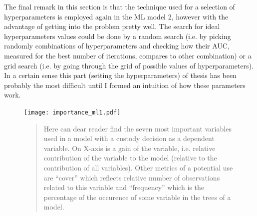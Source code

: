 \documentclass[12pt, twoside,openany]{book} %
\begin{document}
The final remark in this section is that the technique used for a selection of hyperparameters is employed again in the ML model 2, however with the advantage of getting into the problem pretty well. The search for ideal hyperparameters values could be done by a random search (i.e. by picking randomly combinations of hyperparameters and checking how their AUC, measured for the best number of iterations, compares to other combination) or a grid search (i.e. by going through the grid of possible values of hyperparameters). In a certain sense this part (setting the hyperparameters) of thesis has been probably the most difficult until I formed an intuition of how these parameters work.




\begin{figure}[H]
\small{

\texttt{[image: importance\_ml1.pdf]}

\begin{quotation}
Here can dear reader find the seven most important variables used in a model with a custody decision as a dependent variable. On X-axis is a gain of the variable, i.e. relative contribution of the variable to the model (relative to the contribution of all variables). Other metrics of a potential use are “cover” which reflects relative number of observations related to this variable and “frequency” which is the percentage of the occurence of some variable in the trees of a model.

\end{quotation}
}
\end{figure}
\end{document}
